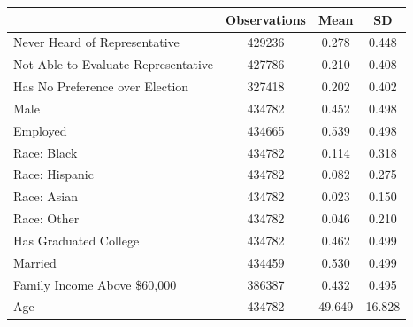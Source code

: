 {
\def\sym#1{\ifmmode^{#1}\else\(^{#1}\)\fi}
\begin{tabular}{l*{1}{ccc}}
\toprule
                    &Observations&        Mean&          SD\\
\midrule
Never Heard of Representative&      429236&       0.278&       0.448\\
Not Able to Evaluate Representative&      427786&       0.210&       0.408\\
Has No Preference over Election&      327418&       0.202&       0.402\\
Male                &      434782&       0.452&       0.498\\
Employed            &      434665&       0.539&       0.498\\
Race: Black         &      434782&       0.114&       0.318\\
Race: Hispanic      &      434782&       0.082&       0.275\\
Race: Asian         &      434782&       0.023&       0.150\\
Race: Other         &      434782&       0.046&       0.210\\
Has Graduated College&      434782&       0.462&       0.499\\
Married             &      434459&       0.530&       0.499\\
Family Income Above $\$$60,000&      386387&       0.432&       0.495\\
Age                 &      434782&      49.649&      16.828\\
\bottomrule
\end{tabular}
}
